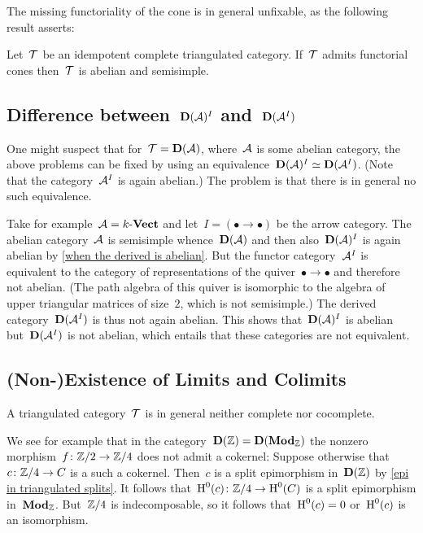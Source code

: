 \documentclass[a4paper,10pt]{scrartcl}
\begin{document}
The missing functoriality of the cone is in general unfixable, as the following result asserts:

\begin{proposition}
  Let~$\mathcal{T}$ be an idempotent complete triangulated category.
  If~$\mathcal{T}$ admits functorial cones then~$\mathcal{T}$ is abelian and semisimple.
\end{proposition}



\subsection{Difference between~$\mathbf{D}(\mathcal{A})^I$ and~$\mathbf{D}(\mathcal{A}^I)$}

One might suspect that for~$\mathcal{T} = \mathbf{D}(\mathcal{A})$, where~$\mathcal{A}$ is some abelian category, the above problems can be fixed by using an equivalence~$\mathbf{D}(\mathcal{A})^I \simeq \mathbf{D}(\mathcal{A}^I)$.
(Note that the category~$\mathcal{A}^I$ is again abelian.)
The problem is that there is in general no such equivalence.

Take for example~$\mathcal{A} = k\text{-}\mathbf{Vect}$ and let~$I = (\bullet \to \bullet)$ be the arrow category.
The abelian category~$\mathcal{A}$ is semisimple whence~$\mathbf{D}(\mathcal{A})$ and then also~$\mathbf{D}(\mathcal{A})^I$ is again abelian by \cref{when the derived is abelian}.
But the functor category~$\mathcal{A}^I$ is equivalent to the category of representations of the quiver~$\bullet \to \bullet$ and therefore not abelian.
(The path algebra of this quiver is isomorphic to the algebra of upper triangular matrices of size~$2$, which is not semisimple.)
The derived category~$\mathbf{D}(\mathcal{A}^I)$ is thus not again abelian.
This shows that~$\mathbf{D}(\mathcal{A})^I$ is abelian but~$\mathbf{D}(\mathcal{A}^I)$ is not abelian, which entails that these categories are not equivalent.



\subsection{(Non-)Existence of Limits and Colimits}

A triangulated category~$\mathcal{T}$ is in general neither complete nor cocomplete.

We see for example that in the category~$\mathbf{D}(\mathbb{Z}) = \mathbf{D}(\mathbf{Mod}_{\mathbb{Z}})$ the nonzero morphism~$f \colon \mathbb{Z}/2 \to \mathbb{Z}/4$ does not admit a cokernel:
Suppose otherwise that~$c \colon \mathbb{Z}/4 \to C$ is a such a cokernel.
Then~$c$ is a split epimorphism in~$\mathbf{D}(\mathbb{Z})$ by \cref{epi in triangulated splits}.
It follows that~$\operatorname{H}^0(c) \colon \mathbb{Z}/4 \to \operatorname{H}^0(C)$ is a split epimorphism in~$\mathbf{Mod}_{\mathbb{Z}}$.
But~$\mathbb{Z}/4$ is indecomposable, so it follows that~$\operatorname{H}^0(c) = 0$ or~$\operatorname{H}^0(c)$ is an isomorphism.
\end{document}
